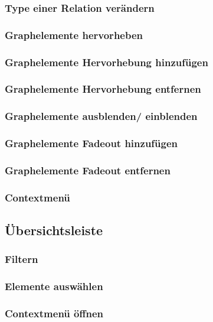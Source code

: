 \documentclass[enabledeprecatedfontcommands,fontsize=11pt,paper=a4,twoside]{scrartcl}
\begin{document}
		\subsubsection{Type einer Relation verändern}
		
		\subsubsection{Graphelemente hervorheben}
		\subsubsection{Graphelemente Hervorhebung hinzufügen}
		\subsubsection{Graphelemente Hervorhebung entfernen}
		
		\subsubsection{Graphelemente ausblenden/ einblenden}
		\subsubsection{Graphelemente Fadeout hinzufügen}
		\subsubsection{Graphelemente Fadeout entfernen}
		
		\subsubsection{Contextmenü}
	
	\subsection{Übersichtsleiste} \label{overwiew}
		\subsubsection{Filtern}
		\subsubsection{Elemente auswählen}
		\subsubsection{Contextmenü öffnen}
		
\end{document}
